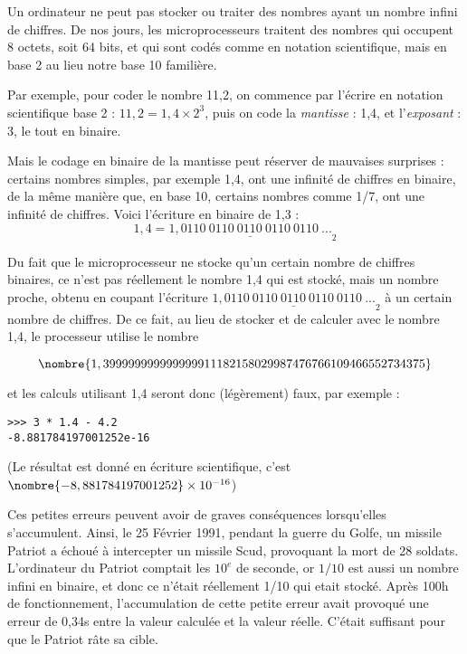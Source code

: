 
\begin{His}

{\color{brown}{\Large Représentation des nombres en informatique}}

\bigskip


Un ordinateur ne peut pas stocker ou traiter des nombres
ayant un nombre infini de chiffres. De nos
jours, les microprocesseurs traitent des nombres qui occupent
8 octets, soit 64 bits, et qui sont codés comme en notation
scientifique, mais en base 2 au lieu notre base 10 familière.

Par exemple, pour coder le nombre 11,2, on commence par l'écrire
en notation scientifique base 2 : $11,2=1,4\times 2^3$, 
puis on code la {\em mantisse} : 1,4, et l'{\em exposant } :  3, 
le tout en binaire.

Mais le codage en binaire de la mantisse peut réserver 
de mauvaises surprises : certains nombres simples, par exemple
1,4, ont une infinité de chiffres en binaire, de la même manière que, en base 10, certains nombres comme 1/7, ont une infinité de chiffres. 
Voici l'écriture en binaire de 1,3 :
\[ 1,4=\underline{1,0110~0110~0110~0110~0110~...}_2 \]
 
Du fait que le microprocesseur ne stocke qu'un certain nombre de chiffres
binaires, ce n'est pas réellement le nombre 1,4 qui est stocké, mais
un nombre proche, obtenu en coupant l'écriture 
$\underline{1,0110~0110~0110~0110~0110~...}_2$ à un certain nombre de chiffres.
De ce fait, au lieu de stocker et de calculer avec le nombre 1,4,
le processeur utilise le nombre

\[ \nombre{1,399999999999999911182158029987476766109466552734375} \]

et les calculs utilisant 1,4 seront donc (légèrement) faux, par exemple :

\begin{verbatim}
>>> 3 * 1.4 - 4.2
-8.881784197001252e-16
\end{verbatim}
(Le résultat est donné en  écriture scientifique, 
c'est $\nombre{-8,881784197001252}\times 10^{-16}$)

\medskip

Ces petites erreurs peuvent avoir de graves conséquences lorsqu'elles
s'accumulent. Ainsi, le 25 Février 1991, pendant la guerre du Golfe, un 
missile Patriot a échoué à intercepter un missile Scud, provoquant
la mort de 28 soldats. L'ordinateur du Patriot comptait les $10^e$ de 
seconde, or $1/10$ est aussi un nombre infini en binaire, et donc
ce n'était réellement 1/10 qui etait stocké. Après 100h de fonctionnement,
l'accumulation de cette petite erreur avait provoqué une erreur de 0,34s
entre la valeur calculée et la valeur réelle. C'était suffisant
pour que le Patriot râte sa cible.

\end{His}





